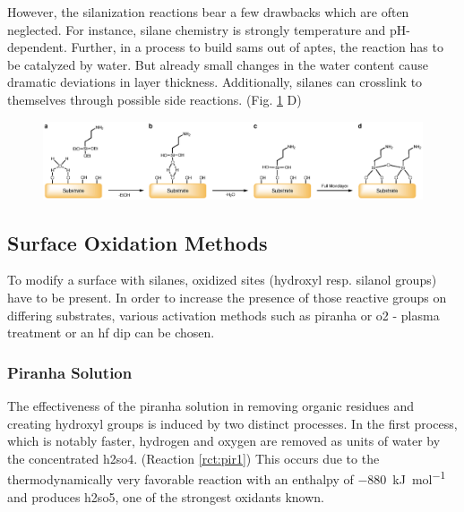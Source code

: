 However, the silanization reactions bear a few drawbacks which are often neglected. For instance, silane chemistry is strongly temperature and pH-dependent. \cite{lit:chem:silaizationTemp,lit:chem:silanizationParameters} Further, in a process to build \glspl{sam} out of \gls{aptes}, the reaction has to be catalyzed by water. But already small changes in the water content cause dramatic deviations in layer thickness. \cite{lit:chem:sin:selectivemod} Additionally, silanes can crosslink to themselves through possible side reactions. (Fig. \ref{fig:chem:APTES} D) \cite{lit:chem:aptes:Crosslink}
\begin{figure}[t!]
	\centering
	\includegraphics[width=1\linewidth]{./Ressources/Chemistry/APTES.eps}
	\label{fig:chem:APTES}
\end{figure}

\subsection{Surface Oxidation Methods}
To modify a surface with silanes, oxidized sites (\gls{hydroxyl} resp. \gls{silanol} groups) have to be present. In order to increase the presence of those reactive groups on differing substrates, various activation methods such as  \gls{piranha} or \gls{o2} - plasma treatment or an \gls{hf} dip can be chosen. \cite{lit:chem:sin:etchingandchemical}

\subsubsection{Piranha Solution}

The effectiveness of the piranha solution in removing organic residues and creating \gls{hydroxyl} groups is induced by two distinct processes. In the first process, which is notably faster, hydrogen and oxygen are removed as units of water by the concentrated \gls{h2so4}.  (Reaction \ref{rct:pir1}) This occurs due to the thermodynamically very favorable reaction with an enthalpy of \SI{-880}{\kilo\joule\per\mole} and produces \gls{h2so5}, one of the strongest oxidants known.  \cite{lit:chem:piranha}

